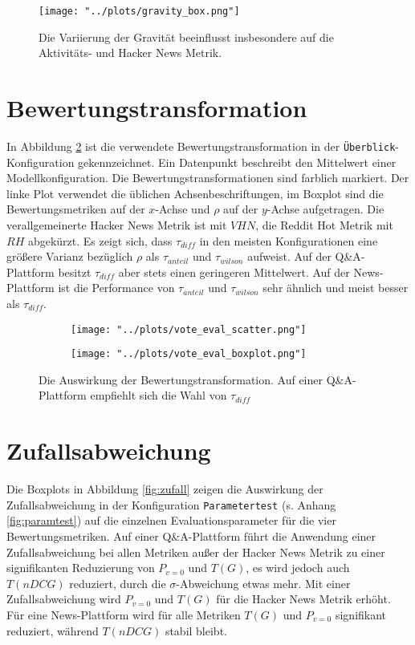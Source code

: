\begin{figure}[!h]
	\texttt{[image: "../plots/gravity\_box.png"]}
	\caption{Die Variierung der Gravität beeinflusst insbesondere auf die Aktivitäts- und Hacker News Metrik.}
	\label{fig:grav}
\end{figure}

\section{Bewertungstransformation}

In Abbildung \ref{fig:trans} ist die verwendete Bewertungstransformation in der \texttt{Überblick}-Konfiguration gekennzeichnet. Ein Datenpunkt beschreibt den Mittelwert einer Modellkonfiguration. Die Bewertungstransformationen sind farblich markiert. Der linke Plot verwendet die üblichen Achsenbeschriftungen, im Boxplot sind die Bewertungsmetriken auf der $x$-Achse und $\rho$ auf der $y$-Achse aufgetragen. Die verallgemeinerte Hacker News Metrik ist mit $VHN$, die Reddit Hot Metrik mit $RH$ abgekürzt. Es zeigt sich, dass $\tau_{diff}$ in den meisten Konfigurationen eine größere Varianz bezüglich $\rho$ als $\tau_{anteil}$ und $\tau_{wilson}$ aufweist. Auf der Q\&A-Plattform besitzt $\tau_{diff}$ aber stets einen geringeren Mittelwert. Auf der News-Plattform ist die Performance von $\tau_{anteil}$ und $\tau_{wilson}$ sehr ähnlich und meist besser als $\tau_{diff}$. 

\begin{figure}[!h]
	\begin{subfigure}{0.5\textwidth}
		\texttt{[image: "../plots/vote\_eval\_scatter.png"]}
	\end{subfigure}
	\begin{subfigure}{0.5\textwidth}
		\texttt{[image: "../plots/vote\_eval\_boxplot.png"]}
	\end{subfigure}
	\caption{Die Auswirkung der Bewertungstransformation. Auf einer Q\&A-Plattform empfiehlt sich die Wahl von $\tau_{diff}$}
	\label{fig:trans}
\end{figure}


\section{Zufallsabweichung}


Die Boxplots in Abbildung \ref{fig:zufall} zeigen die Auswirkung der Zufallsabweichung in der Konfiguration \texttt{Parametertest} (s. Anhang \ref{fig:paramtest}) auf die einzelnen Evaluationsparameter für die vier Bewertungsmetriken. Auf einer Q\&A-Plattform führt die Anwendung einer Zufallsabweichung bei allen Metriken außer der Hacker News Metrik zu einer signifikanten Reduzierung von $P_{v=0}$ und $T(G)$, es wird jedoch auch $T(nDCG)$ reduziert, durch die $\sigma$-Abweichung etwas mehr. Mit einer Zufallsabweichung wird $P_{v=0}$ und $T(G)$ für die Hacker News Metrik erhöht. Für eine News-Plattform wird für alle Metriken $T(G)$ und $P_{v=0}$ signifikant reduziert, während $T(nDCG)$ stabil bleibt.

